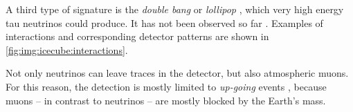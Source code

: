 %
A third type of signature is the
    \emph{double bang} \cite{kowalski2017}
    or \emph{lollipop} \cite{neutrinos_beacom},
  which very high energy tau neutrinos could produce.
It has not been observed so far \cite{neutrinos_aartsen_tau}.
%
Examples of interactions and corresponding detector patterns are shown in \autoref{fig:img:icecube:interactions}.

 \label{sec:neutrino_astronomy:icecube:up_going}
Not only neutrinos can leave traces in the detector, %
  but also atmospheric muons.
For this reason,
  the detection is mostly limited to \emph{up-going} events \cite{icecube_aartsen},
    because muons
      – in contrast to neutrinos –
    are mostly blocked by the Earth's mass.


